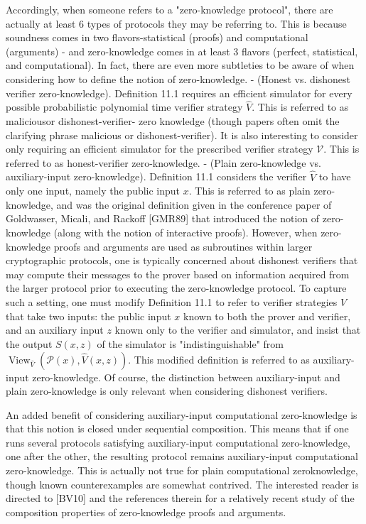Accordingly, when someone refers to a "zero-knowledge protocol", there are actually at least 6 types of protocols they may be referring to. This is because soundness comes in two flavors-statistical (proofs) and computational (arguments) - and zero-knowledge comes in at least 3 flavors (perfect, statistical, and computational). In fact, there are even more subtleties to be aware of when considering how to define the notion of zero-knowledge.
- (Honest vs. dishonest verifier zero-knowledge). Definition 11.1 requires an efficient simulator for every possible probabilistic polynomial time verifier strategy $\hat{V}$. This is referred to as maliciousor dishonest-verifier- zero knowledge (though papers often omit the clarifying phrase malicious or dishonest-verifier). It is also interesting to consider only requiring an efficient simulator for the prescribed verifier strategy $\mathcal{V}$. This is referred to as honest-verifier zero-knowledge.
- (Plain zero-knowledge vs. auxiliary-input zero-knowledge). Definition 11.1 considers the verifier $\hat{V}$ to have only one input, namely the public input $x$. This is referred to as plain zero-knowledge, and was the original definition given in the conference paper of Goldwasser, Micali, and Rackoff [GMR89] that introduced the notion of zero-knowledge (along with the notion of interactive proofs). However, when zero-knowledge proofs and arguments are used as subroutines within larger cryptographic protocols, one is typically concerned about dishonest verifiers that may compute their messages to the prover based on information acquired from the larger protocol prior to executing the zero-knowledge protocol. To capture such a setting, one must modify Definition 11.1 to refer to verifier strategies $\hat{V}$ that take two inputs: the public input $x$ known to both the prover and verifier, and an auxiliary input $z$ known only to the verifier and simulator, and insist that the output $S(x, z)$ of the simulator is "indistinguishable" from $\operatorname{View}_{\hat{V}}(\mathcal{P}(x), \hat{V}(x, z))$. This modified definition is referred to as auxiliary-input zero-knowledge. Of course, the distinction between auxiliary-input and plain zero-knowledge is only relevant when considering dishonest verifiers.

An added benefit of considering auxiliary-input computational zero-knowledge is that this notion is closed under sequential composition. This means that if one runs several protocols satisfying auxiliary-input computational zero-knowledge, one after the other, the resulting protocol remains auxiliary-input computational zero-knowledge. This is actually not true for plain computational zeroknowledge, though known counterexamples are somewhat contrived. The interested reader is directed to [BV10] and the references therein for a relatively recent study of the composition properties of zero-knowledge proofs and arguments.

